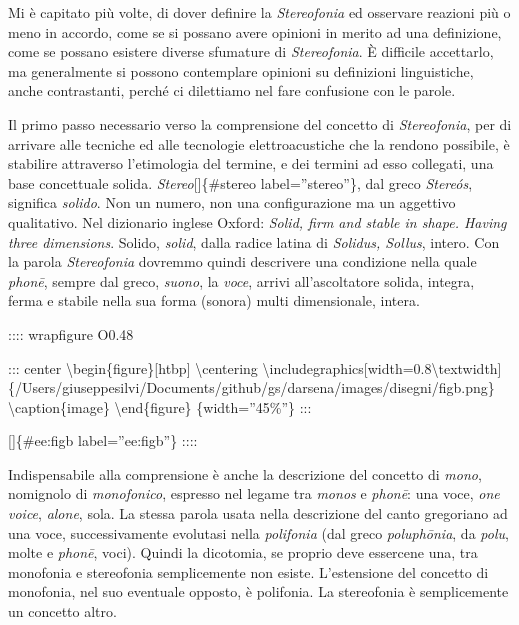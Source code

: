 \documentclass[a4paper,11pt]{article}
\begin{document}
Mi è capitato più volte, di dover definire la \emph{Stereofonia} ed osservare
reazioni più o meno in accordo, come se si possano avere opinioni in
merito ad una definizione, come se possano esistere diverse sfumature di
\emph{Stereofonia}. È difficile accettarlo, ma generalmente si possono
contemplare opinioni su definizioni linguistiche, anche contrastanti,
perché ci dilettiamo nel fare confusione con le parole.

Il primo passo necessario verso la comprensione del concetto di
\emph{Stereofonia}, per di arrivare alle tecniche ed alle tecnologie
elettroacustiche che la rendono possibile, è stabilire attraverso
l'etimologia del termine, e dei termini ad esso collegati, una base
concettuale solida. \emph{Stereo}{[}{]}\{\#stereo label=''stereo''\}, dal greco
\emph{Stereós}, significa \emph{solido}. Non un numero, non una configurazione ma
un aggettivo qualitativo. Nel dizionario inglese Oxford: \emph{Solid, firm
and stable in shape. Having three dimensions}. Solido, \emph{solid}, dalla
radice latina di \emph{Solidus, Sollus}, intero. Con la parola \emph{Stereofonia}
dovremmo quindi descrivere una condizione nella quale \emph{phonē}, sempre
dal greco, \emph{suono}, la \emph{voce}, arrivi all'ascoltatore solida, integra,
ferma e stabile nella sua forma (sonora) multi dimensionale, intera.

:::: wrapfigure
O0.48

::: center
\textbackslash{}begin\{figure\}{[}htbp{]}
  \textbackslash{}centering
  \textbackslash{}includegraphics{[}width=0.8\textbackslash{}textwidth{]}\{/Users/giuseppesilvi/Documents/github/gs/darsena/images/disegni/figb.png\}
  \textbackslash{}caption\{image\}
\textbackslash{}end\{figure\}
\{width=''45\%''\}
:::

{[}{]}\{\#ee:figb label=''ee:figb''\}
::::

Indispensabile alla comprensione è anche la descrizione del concetto di
\emph{mono}, nomignolo di \emph{monofonico}, espresso nel legame tra \emph{monos} e
\emph{phonē}: una voce, \emph{one voice}, \emph{alone}, sola. La stessa parola usata
nella descrizione del canto gregoriano ad una voce, successivamente
evolutasi nella \emph{polifonia} (dal greco \emph{poluphōnia}, da \emph{polu}, molte e
\emph{phonē}, voci). Quindi la dicotomia, se proprio deve essercene una, tra
monofonia e stereofonia semplicemente non esiste. L'estensione del
concetto di monofonia, nel suo eventuale opposto, è polifonia. La
stereofonia è semplicemente un concetto altro.
\end{document}

